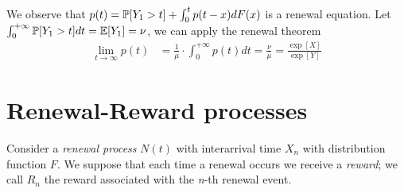 	We observe that $p(t)= \mathbb{P}[Y_1>t]+\int_0^t p(t-x)dF(x)$ is a renewal equation. Let $\int_0^{+\infty}\mathbb{P}[Y_1>t]dt=\mathbb{E}[Y_1]=\nu$, we can apply the renewal theorem
	\begin{align*}
		\lim_{t \to \infty} p(t) & = \frac{1}{\mu}\cdot\int_0^{+\infty}p(t)dt = \frac{\nu}{\mu}= \frac{\exp[X]}{\exp[Y]}
	\end{align*}

\section{Renewal-Reward processes}
Consider a \textit{renewal process} $N(t)$ with interarrival time $X_n$ with distribution function $F$. We suppose that each time a renewal occurs we receive a \textit{reward}; we call $R_n$ the reward associated with the \emph{n}-th renewal event.

